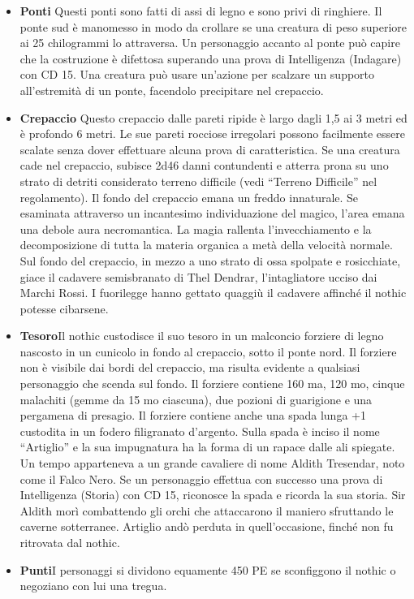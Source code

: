 \documentclass{article}
\begin{document}
\begin{itemize}
    \item \textbf{Ponti} Questi ponti sono fatti di assi di legno e sono privi
    di ringhiere. Il ponte sud è manomesso in modo da crollare se una creatura di peso superiore ai 25 chilogrammi lo
    attraversa. Un personaggio accanto al ponte può capire che la
    costruzione è difettosa superando una prova di Intelligenza
    (Indagare) con CD 15. Una creatura può usare un'azione per
    scalzare un supporto all'estremità di un ponte, facendolo
    precipitare nel crepaccio. 
    \item \textbf{Crepaccio} Questo crepaccio dalle pareti ripide è largo
    dagli 1,5 ai 3 metri ed è profondo 6 metri. Le sue pareti
    rocciose irregolari possono facilmente essere scalate senza
    dover effettuare alcuna prova di caratteristica. Se una
    creatura cade nel crepaccio, subisce 2d46 danni contundenti
    e atterra prona su uno strato di detriti considerato terreno
    difficile (vedi “Terreno Difficile” nel regolamento).
    Il fondo del crepaccio emana un freddo innaturale. Se
    esaminata attraverso un incantesimo individuazione del
    magico, l’area emana una debole aura necromantica. La
    magia rallenta l'invecchiamento e la decomposizione di tutta
    la materia organica a metà della velocità normale.
    Sul fondo del crepaccio, in mezzo a uno strato di ossa
    spolpate e rosicchiate, giace il cadavere semisbranato di
    Thel Dendrar, l'intagliatore ucciso dai Marchi Rossi. I
    fuorilegge hanno gettato quaggiù il cadavere affinché il nothic
    potesse cibarsene.
    \item \textbf{Tesoro}Il nothic custodisce il suo tesoro in un malconcio forziere di
    legno nascosto in un cunicolo in fondo al crepaccio, sotto il
    ponte nord. Il forziere non è visibile dai bordi del crepaccio,
    ma risulta evidente a qualsiasi personaggio che scenda sul
    fondo. Il forziere contiene 160 ma, 120 mo, cinque malachiti
    (gemme da 15 mo ciascuna), due pozioni di guarigione e una
    pergamena di presagio. Il forziere contiene anche una spada lunga +1 custodita in
    un fodero filigranato d’argento. Sulla spada è inciso il nome
    “Artiglio” e la sua impugnatura ha la forma di un rapace dalle
    ali spiegate. Un tempo apparteneva a un grande cavaliere
    di nome Aldith Tresendar, noto come il Falco Nero. Se un
    personaggio effettua con successo una prova di Intelligenza
    (Storia) con CD 15, riconosce la spada e ricorda la sua storia.
    Sir Aldith morì combattendo gli orchi che attaccarono il
    maniero sfruttando le caverne sotterranee. Artiglio andò
    perduta in quell’occasione, finché non fu ritrovata dal nothic.
    \item \textbf{Punti}I personaggi si dividono equamente 450 PE se sconfiggono il
                nothic o negoziano con lui una tregua.
\end{itemize}
\end{document}
